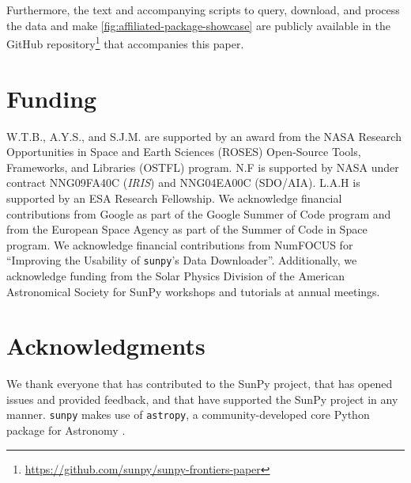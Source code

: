 \documentclass[utf8]{FrontiersinHarvard}
\newcommand{\package}[1]{\texttt{#1}\xspace}
\newcommand{\github}{GitHub\xspace}
\newcommand{\sunpy}{SunPy\xspace}
\newcommand{\sunpyproj}{SunPy project\xspace}
\newcommand{\sunpypkg}{\package{sunpy}}
\newcommand{\astropypkg}{\package{astropy}}
\begin{document}
Furthermore, the text and accompanying scripts to query, download, and process the data and make \autoref{fig:affiliated-package-showcase} are publicly available in the \github repository\footnote{\url{https://github.com/sunpy/sunpy-frontiers-paper}} that accompanies this paper.

\section*{Funding}
\label{sec:funding}

W.T.B., A.Y.S., and S.J.M. are supported by an award from the NASA Research Opportunities in Space and Earth Sciences (ROSES) Open-Source Tools, Frameworks, and Libraries (OSTFL) program.
N.F is supported by NASA under contract NNG09FA40C ({\it IRIS}) and NNG04EA00C (SDO/AIA).
L.A.H is supported by an ESA Research Fellowship.
We acknowledge financial contributions from Google as part of the Google Summer of Code program and from the European Space Agency as part of the Summer of Code in Space program.
We acknowledge financial contributions from NumFOCUS for \enquote{Improving the Usability of \sunpypkg's Data Downloader}.
Additionally, we acknowledge funding from the Solar Physics Division of the American Astronomical Society for \sunpy workshops and tutorials at annual meetings.

\section*{Acknowledgments}
\label{sec:acknowledgments}

We thank everyone that has contributed to the \sunpyproj, that has opened issues and provided feedback, and that have supported the \sunpyproj in any manner.
\sunpypkg makes use of \astropypkg, a community-developed core Python package for Astronomy \citep{astropy_collaboration_astropy_2022}.




\listofchanges
\end{document}
